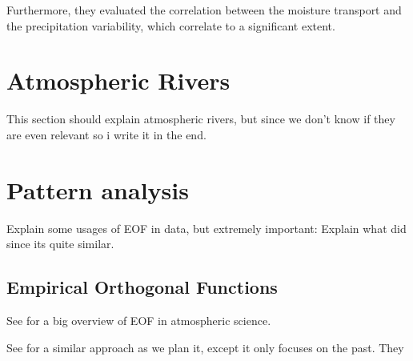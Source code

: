 Furthermore, they evaluated the correlation between the moisture transport and the precipitation variability, which correlate to a significant extent.

\section{Atmospheric Rivers}
\label{sec:atmo-rivers}


This section should explain atmospheric rivers, but since we don't know if they are even relevant so i write it in the end. 

\section{Pattern analysis}

Explain some usages of EOF in data, but extremely important: Explain what \cite{ayantobo_integrated_2022} did since its quite similar. 

\subsection{Empirical Orthogonal Functions}

See \cite{hannachi_empirical_2007} for a big overview of EOF in atmospheric science.

See \cite{ayantobo_integrated_2022} for a similar approach as we plan it, except it only focuses on the past.
They 
